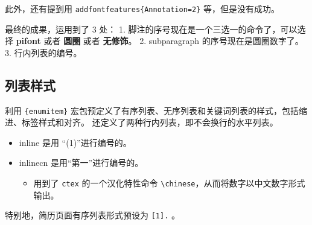 \documentclass[../Main/thesis.tex]{subfiles}
\begin{document}
\begin{Shaded}
\end{Shaded}

此外，还有提到用 \texttt{addfontfeatures\{Annotation=2\}}
等，但是没有成功。

最终的成果，运用到了 3 处： 1.
脚注的序号现在是一个三选一的命令了，可以选择 \textbf{pifont} 或者
\textbf{圆圈} 或者 \textbf{无修饰}。 2. subparagraph
的序号现在是圆圈数字了。 3. 行内列表的编号。

\subsection{列表样式}

利用 \texttt{\{enumitem\}}
宏包预定义了有序列表、无序列表和关键词列表的样式，包括缩进、标签样式和对齐。
还定义了两种行内列表，即不会换行的水平列表。

\begin{itemize}
\item
  inline 是用 ``(1)''进行编号的。
\item
  inlinecn 是用``第一''进行编号的。

  \begin{itemize}
  \item
    用到了 \texttt{ctex} 的一个汉化特性命令
    \texttt{\textbackslash{}chinese}，从而将数字以中文数字形式输出。
  \end{itemize}
\end{itemize}

特别地，简历页面有序列表形式预设为 \texttt{{[}1{]}.} 。
\end{document}

